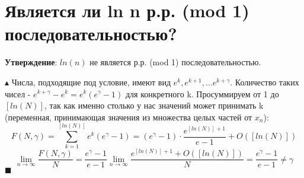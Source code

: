 \setcounter{section}{76}
\section{Является ли ln n р.р. (mod 1) последовательностью?}
\textbf{Утверждение}: $ln(n)$ не является р.р. (mod 1) последовательностью. \par
$\blacktriangle$
Числа, подходящие под условие, имеют вид $e^k, e^{k+1}, \dots e^{k+\gamma}$. Количество таких чисел - $e^{k+\gamma} - e^k = e^k(e^{\gamma} - 1)$ для конкретного k. Просуммируем от 1 до $[ln(N)]$, так как именно столько у нас значений может принимать k (переменная, принимающая значения из множества целых частей от $x_n$): 
\[ F(N, \gamma) = \sum_{k=1}^{[ln(N)]} e^k(e^{\gamma} - 1) = (e^{\gamma} - 1) \cdot \frac{e^{[ln(N)] + 1}}{e - 1} + O([ln(N)])
\]
\[ \lim_{n \to \infty} \frac{F(N, \gamma)}{N} = \frac{e^{\gamma} - 1}{e - 1} \lim_{n \to \infty} \frac{e^{[ln(N)] + 1}  + O([ln(N)])}{N} = \frac{e^{\gamma} - 1}{e - 1} \neq \gamma\]
$\blacksquare$